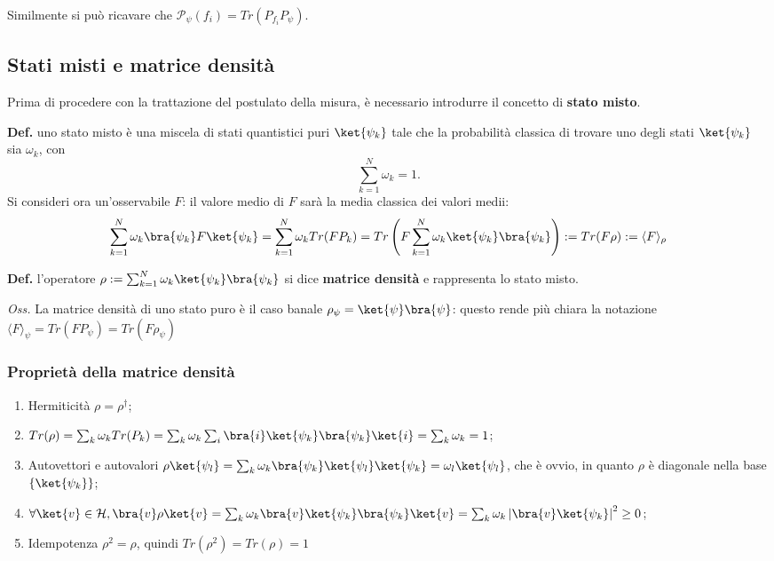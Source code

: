 Similmente si può ricavare che $\mathcal{P}_{\psi}(f_i) = Tr(P_{f_i}P_{\psi})$.

\subsection{Stati misti e matrice densità}
Prima di procedere con la trattazione del postulato della misura, è necessario introdurre il concetto
di \textbf{stato misto}.

\textbf{Def.} uno stato misto è una miscela di stati quantistici puri $\ket{\psi_k}$ tale che la
probabilità classica di trovare uno degli stati $\ket{\psi_k}$ sia $\omega_k$, con
$$
\sum_{k=1}^{N}\omega_k=1.
$$
Si consideri ora un'osservabile $F$: il valore medio di $F$ sarà la media classica dei valori medii:
$$ \sum_{k=1}^{N} \omega_k \bra{\psi_k}F\ket{\psi_k} = \sum_{k=1}^{N}\omega_k Tr(FP_k) =
Tr\left(F \sum_{k=1}^{N} \omega_k \ket{\psi_k}\bra{\psi_k}\right) := Tr(F\rho):=\langle F\rangle_\rho$$

\textbf{Def.} l'operatore $\rho :=\sum_{k=1}^{N}\omega_k\ket{\psi_k}\bra{\psi_k}$ si dice \textbf{matrice
densità} e rappresenta lo stato misto.

\textit{Oss.} La matrice densità di uno stato puro è il caso banale $\rho_\psi = \ket{\psi}\bra{\psi}$:
questo rende più chiara la notazione $\langle F\rangle_\psi = Tr(FP_\psi) = Tr(F\rho_\psi)$

\subsubsection{Proprietà della matrice densità}
\begin{enumerate}
    \item Hermiticità $\rho = \rho^{\dagger}$;
    \item $Tr(\rho) = \sum_{k}^{}\omega_k Tr(P_k) =
	\sum_{k}^{}\omega_k\sum_{i}^{}\bra{i}\ket{\psi_k}\bra{\psi_k}\ket{i} = \sum_{k}^{}\omega_k  = 1$;
    \item Autovettori e autovalori $\rho\ket{\psi_l}
	= \sum_{k}^{}\omega_k\bra{\psi_k}\ket{\psi_l}\ket{\psi_k} = \omega_l\ket{\psi_l}$, che è
	ovvio, in quanto $\rho$ è diagonale nella base $\left\{\ket{\psi_k}\right\}$;
    \item $\forall \ket{v}\in\mathcal{H}, \bra{v}\rho\ket{v}
	= \sum_{k}^{} \omega_k \bra{v}\ket{\psi_k}\bra{\psi_k}\ket{v}
	= \sum_{k}^{} \omega_k \left|\bra{v}\ket{\psi_k} \right|^2 \geq 0$;
    \item Idempotenza $\rho^2 = \rho$, quindi $Tr(\rho^2) = Tr(\rho) = 1$
\end{enumerate}

